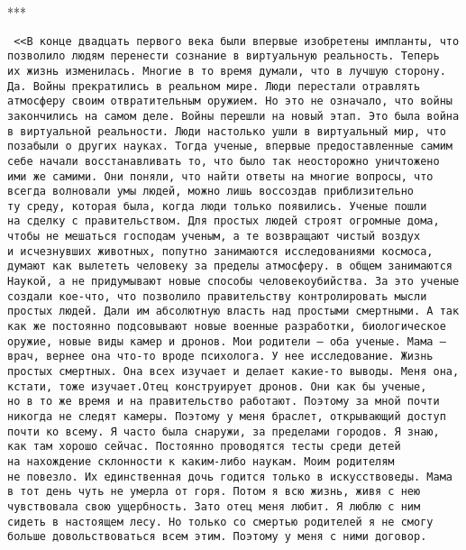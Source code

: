  \begin{center}
 	***
 \end{center}
{\tt
\setlength{\leftskip}{1em}
\setlength{\rightskip}{6em}
<<В~конце двадцать первого века были впервые изобретены импланты, что позволило людям перенести сознание в~виртуальную реальность.
Теперь их~жизнь изменилась.
Многие в~то~время думали, что в~лучшую сторону.
Да.
Войны прекратились в~реальном мире.
Люди перестали отравлять атмосферу своим отвратительным оружием.
Но~это не~означало, что войны закончились на~самом деле.
Войны перешли на~новый этап.
Это была война в~виртуальной реальности.
Люди настолько ушли в~виртуальный мир, что позабыли о~других науках.
Тогда ученые, впервые предоставленные самим себе начали восстанавливать то, что было так неосторожно уничтожено ими же~самими.
Они поняли, что найти ответы на~многие вопросы, что всегда волновали умы людей, можно лишь воссоздав приблизительно ту~среду, которая была, когда люди только появились.
Ученые пошли на~сделку с~правительством.
Для простых людей строят огромные дома, чтобы не~мешаться господам ученым, а~те~возвращают чистый воздух и~исчезнувших животных, попутно занимаются исследованиями космоса, думают как вылететь человеку за~пределы атмосферу.
в~общем занимаются Наукой, а~не~придумывают новые способы человекоубийства.
За~это ученые создали кое-что, что позволило правительству контролировать мысли простых людей.
Дали им~абсолютную власть над простыми смертными.
А~так как же~постоянно подсовывают новые военные разработки, биологическое оружие, новые виды камер и~дронов.
Мои родители --- оба ученые.
Мама ---врач, вернее она что-то вроде психолога.
У~нее исследование.
Жизнь простых смертных.
Она всех изучает и~делает какие-то выводы.
Меня она, кстати, тоже изучает.Отец конструирует дронов.
Они как бы~ученые, но~в~то~же~время и~на~правительство работают.
Поэтому за~мной почти никогда не~следят камеры.
Поэтому у~меня браслет, открывающий доступ почти ко~всему.
Я~часто была снаружи, за~пределами городов.
Я~знаю, как там хорошо сейчас.
Постоянно проводятся тесты среди детей на~нахождение склонности к~каким-либо наукам.
Моим родителям не~повезло.
Их~единственная дочь годится только в~искусствоведы.
Мама в~тот день чуть не~умерла от~горя.
Потом я~всю жизнь, живя с~нею чувствовала свою ущербность.
Зато отец меня любит.
Я~люблю с~ним сидеть в~настоящем лесу.
Но~только со~смертью родителей я~не~смогу больше довольствоваться всем этим.
Поэтому у~меня с~ними договор.

}
